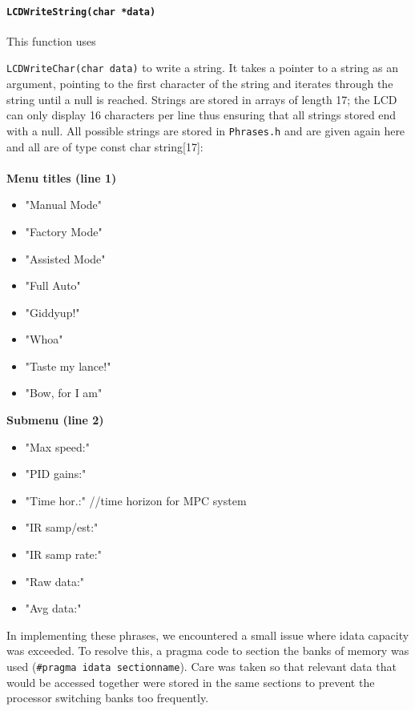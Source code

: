 \documentclass{article}
\begin{document}
\paragraph{\texttt{LCD\textunderscore Write\textunderscore String(char *data)}} This function uses {\texttt{LCD\textunderscore Write\textunderscore Char(char data)} to write a string. It takes a pointer to a string as an argument, pointing to the first character of the string and iterates through the string until a null is reached. Strings are stored in arrays of length 17; the LCD can only display 16 characters per line thus ensuring that all strings stored end with a null. All possible strings are stored in \texttt{Phrases.h} and are given again here and all are of type const char string[17]:\\\\
\textbf{Menu titles (line 1)}
\begin{itemize}
	\item "Manual Mode"
	\item "Factory Mode"
	\item "Assisted Mode"
	\item "Full Auto"
	\item "Giddyup!"
	\item "Whoa"
	\item "Taste my lance!"
	\item "Bow, for I am"
	
\end{itemize}
\textbf{Submenu (line 2)}
\begin{itemize}
		\item "Max speed:"
		\item "PID gains:"
		\item "Time hor.:"	//time horizon for MPC system
		\item "IR samp/est:"
		\item "IR samp rate:"
		\item "Raw data:"
		\item "Avg data:"

\end{itemize}
	
In implementing these phrases, we encountered a small issue where idata capacity was exceeded. To resolve this, a pragma code to section the banks of memory was used (\texttt{\#pragma idata section\textunderscore name}). Care was taken so that relevant data that would be accessed together were stored in the same sections to prevent the processor switching banks too frequently.

}
\end{document}
